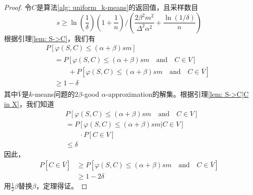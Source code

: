 \begin{proof}
    令$C$是算法\ref{alg: uniform_k-means}的返回值，且采样数目
    \begin{equation*}
    s \geq \ln(\frac{1}{\delta})(1+\frac{1}{n})/(\frac{2\beta^2 m^2}{\Delta^2 \alpha^2}+\frac{\ln(1/\delta)}{n})
    \end{equation*}
    根据引理\ref{lem: S->C}，我们有
    \begin{gather*}
        P[\varphi(S,C) \leq (\alpha + \beta)sm] \\
        \begin{align}
            &= P[\varphi(S,C) \leq (\alpha + \beta)sm \quad \text{and} \quad C \in V] \\
            & \qquad {} + P[\varphi(S,C) \leq (\alpha + \beta)sm \quad \text{and} \quad C \in \bar{V}] \\
            &\geq 1-\delta
        \end{align}
    \end{gather*}
    其中$\bar{V}$是$k$-means问题的$2\beta$-good $\alpha$-approximation的解集。根据引理\ref{lem: S->C|C in X}，我们知道
    \begin{align*}
    &P[\varphi(S,C) \leq (\alpha + \beta)sm \quad \text{and} \quad C \in V] \\
    &= P[\varphi(S,C) \leq (\alpha+\beta)sm | C \in V] \\
    &\qquad {} \cdot P[C \in V] \\
    &\leq \delta
    \end{align*}
    因此，
    \begin{align*}
    P[C \in \bar{V}] 
    &\geq P[\varphi(S,C) \leq (\alpha + \beta)sm \quad \text{and} \quad C \in \bar{V}] \\
    &\geq 1-2\delta
    \end{align*}
    用$\frac{1}{2}\beta$替换$\beta$，定理得证。
\end{proof}

